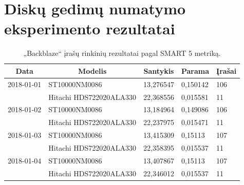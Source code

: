 \documentclass{VUMIFPSkursinis}
\begin{document}
\section{Diskų gedimų numatymo eksperimento rezultatai}
\begin{table}[H]
\centering
\caption{„Backblaze“ įrašų rinkinių rezultatai pagal SMART 5 metriką.}
\label{tab:rez5}
{\begin{tabular}{|c|l|l|l|l|}
\hline
\textbf{Data}                                   & \multicolumn{1}{c|}{\textbf{Modelis}} & \multicolumn{1}{c|}{\textbf{Santykis}} & \multicolumn{1}{c|}{\textbf{Parama}} & \multicolumn{1}{c|}{\textbf{Įrašai}} \\ \hline
2018-01-01                                      & ST10000NM0086                         & 13,276547                              & 0,150142                             & 106                                  \\ \hline
\cellcolor[HTML]{C0C0C0}{\color[HTML]{333333} } & Hitachi HDS722020ALA330               & 22,368556                              & 0,015581                             & 11                                   \\ \hline
2018-01-02                                      & ST10000NM0086                         & 13,184964                              & 0,149086                             & 106                                  \\ \hline
\cellcolor[HTML]{C0C0C0}                        & Hitachi HDS722020ALA330               & 22,237975                              & 0,015471                             & 11                                   \\ \hline
2018-01-03                                      & ST10000NM0086                         & 13,415309                              & 0,15113                              & 107                                  \\ \hline
\cellcolor[HTML]{C0C0C0}                        & Hitachi HDS722020ALA330               & 22,358395                              & 0,015537                             & 11                                   \\ \hline
2018-01-04                                      & ST10000NM0086                         & 13,407867                              & 0,15113                              & 107                                  \\ \hline
\cellcolor[HTML]{C0C0C0}                        & Hitachi HDS722020ALA330               & 22,346012                              & 0,015537                             & 11                                   \\ \hline

\end{tabular}}
\end{table}
\end{document}
